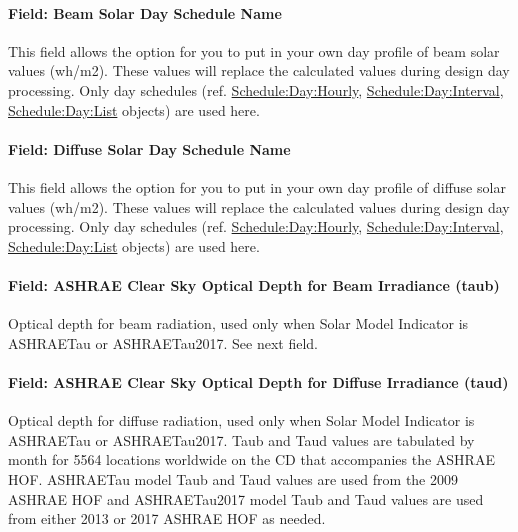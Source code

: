 \paragraph{Field: Beam Solar Day Schedule Name}\label{field-beam-solar-day-schedule-name}

This field allows the option for you to put in your own day profile of beam solar values (wh/m2). These values will replace the calculated values during design day processing. Only day schedules (ref. \hyperref[scheduledayhourly]{Schedule:Day:Hourly}, \hyperref[scheduledayinterval]{Schedule:Day:Interval}, \hyperref[scheduledaylist]{Schedule:Day:List} objects) are used here.

\paragraph{Field: Diffuse Solar Day Schedule Name}\label{field-diffuse-solar-day-schedule-name}

This field allows the option for you to put in your own day profile of diffuse solar values (wh/m2). These values will replace the calculated values during design day processing. Only day schedules (ref. \hyperref[scheduledayhourly]{Schedule:Day:Hourly}, \hyperref[scheduledayinterval]{Schedule:Day:Interval}, \hyperref[scheduledaylist]{Schedule:Day:List} objects) are used here.

\paragraph{Field: ASHRAE Clear Sky Optical Depth for Beam Irradiance (taub)}\label{field-ashrae-clear-sky-optical-depth-for-beam-irradiance-taub}

Optical depth for beam radiation, used only when Solar Model Indicator is ASHRAETau or ASHRAETau2017. See next field.

\paragraph{Field: ASHRAE Clear Sky Optical Depth for Diffuse Irradiance (taud)}\label{field-ashrae-clear-sky-optical-depth-for-diffuse-irradiance-taud}

Optical depth for diffuse radiation, used only when Solar Model Indicator is ASHRAETau or ASHRAETau2017. Taub and Taud values are tabulated by month for 5564 locations worldwide on the CD that accompanies the ASHRAE HOF.
ASHRAETau model Taub and Taud values are used from the 2009 ASHRAE HOF and ASHRAETau2017 model Taub and Taud values are used from either 2013 or 2017 ASHRAE HOF as needed.

